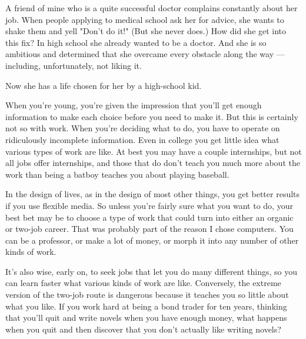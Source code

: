 A friend of mine who is a
                  quite successful doctor complains constantly about her job.
                  When people applying to medical school ask her for advice, she
                  wants to shake them and yell "Don't do it!" (But she never
                  does.) How did she get into this fix? In high school she
                  already wanted to be a doctor. And she is so ambitious and
                  determined that she overcame every obstacle along the way
                  --- including, unfortunately, not liking it.

Now
                  she has a life chosen for her by a high-school kid.

When
                  you're young, you're given the impression that you'll get
                  enough information to make each choice before you need to make
                  it. But this is certainly not so with work. When you're
                  deciding what to do, you have to operate on ridiculously
                  incomplete information. Even in college you get little idea
                  what various types of work are like. At best you may have a
                  couple internships, but not all jobs offer internships, and
                  those that do don't teach you much more about the work than
                  being a batboy teaches you about playing baseball.

In
                  the design of lives, as in the design of most other things,
                  you get better results if you use flexible media. So unless
                  you're fairly sure what you want to do, your best bet may be
                  to choose a type of work that could turn into either an
                  organic or two-job career. That was probably part of the
                  reason I chose computers. You can be a professor, or make a
                  lot of money, or morph it into any number of other kinds of
                  work.

It's also wise, early on, to seek jobs that
                  let you do many different things, so you can learn faster what
                  various kinds of work are like. Conversely, the extreme
                  version of the two-job route is dangerous because it teaches
                  you so little about what you like. If you work hard at being a
                  bond trader for ten years, thinking that you'll quit and write
                  novels when you have enough money, what happens when you quit
                  and then discover that you don't actually like writing
                  novels?

